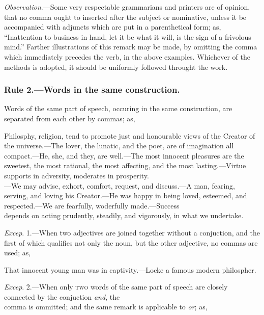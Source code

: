 \emph{Observation}.---Some very respectable grammarians and printers are of
opinion, that no comma ought to inserted after the subject or nominative,
unless it be accompanied with adjuncts which are put in a parenthetical form;
as, ``Inattention to business in hand, let it be what it will, is the sign of a
frivolous mind.'' Farther illustrations of this remark may be made, by omitting
the comma which immediately precedes the verb, in the above examples. Whichever
of the methods is adopted, it should be uniformly followed throught the work.

\subsubsection{Rule 2.---Words in the same construction.}

Words of the same part of speech, occuring in the same construction, are
separated from each other by commas; as,

\begin{example}
    Philosphy, religion, tend to promote just and honourable views of the
    Creator of the universe.---The lover, the lunatic, and the poet, are of
    imagination all compact.---He, she, and they, are well.---The most innocent
    pleasures are the sweetest, the most rational, the most affecting, and the
    most lasting.---Virtue supports in adversity, moderates in
    prosperity.\\---We may advise, exhort, comfort, request, and discuss.---A
    man, fearing, serving, and loving his Creator.---He was happy in being
    loved, esteemed, and respected.---We are fearfully, woderfully
    made.---Success\\depends on acting prudently, steadily, and vigorously, in
    what we undertake.
\end{example}

\emph{Excep}. 1.---When two adjectives are joined together without a conjuction,
and the first of which qualifies not only the noun, but the other adjective, no
commas are used; as,

\begin{example}
    That innocent young man was in captivity.---Locke a famous modern
    philospher.
\end{example}

\emph{Excep}. 2.---When only \textsc{two} words of the same part of speech are
closely connected by the conjuction \emph{and}, the\\comma is ommitted; and the
same remark is applicable to \emph{or}; as,

